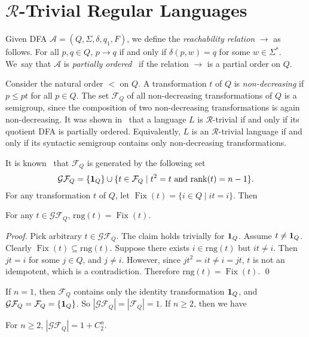 \documentclass{llncs}
\renewcommand{\le}{\leqslant}
\renewcommand{\ge}{\geqslant}
\newcommand{\Sig}{\Sigma}
\newcommand{\txt}[1]{\mbox{ #1 }}
\newcommand{\trng}{\mathrm{rng}}
\newcommand{\trank}{\mathrm{rank}}
\newcommand{\tid}{\mbox{{\bf 1}}}
\newcommand{\cA}{{\mathcal A}}
\newcommand{\cF}{{\mathcal F}}
\newcommand{\cG}{{\mathcal G}}
\newcommand{\gR}{{\mathcal R}}
\newcommand{\ra}{{\rightarrow}}
\DeclareMathOperator{\Fix}{Fix}
\begin{document}
\section{$\gR$-Trivial Regular Languages}\label{sec:Rtrivial} 

Given DFA $\cA = (Q, \Sig, \delta, q_1, F)$, we  define the \emph{reachability relation} $\ra$ as follows. For all $p, q \in Q$, $p \mathbin{\ra} q$ if and only if $\delta(p, w) = q$ for some $w \in \Sig^*$. We~say that $\cA$ is \emph{partially ordered}~\cite{BrFi80} if the relation $\ra$ is a partial order on $Q$. 

Consider the natural order $<$ on $Q$. A transformation $t$ of $Q$ is \emph{non-decreasing} if $p \le pt$ for all $p \in Q$. The set $\cF_Q$ of all non-decreasing transformations of $Q$ is a semigroup, since the composition of two non-decreasing transformations is again non-decreasing. It was shown in~\cite{BrFi80} that a language $L$ is $\gR$-trivial if and only if its quotient DFA is partially ordered. Equivalently, $L$ is an $\gR$-trivial language if and only if its syntactic semigroup contains only non-decreasing transformations. 


 It is known~\cite{GaMa09} that  $\cF_Q$ is generated by the following set 
$$\cG\cF_Q = \{\tid_Q\} \cup \{t \in \cF_Q \mid t^2 = t \txt{and} \trank(t) = n-1\}.$$
For any transformation $t$ of $Q$, let $\Fix(t) = \{i \in Q \mid it = i\}$. Then 


\begin{lemma}\label{lem:fixrank} 
For any $t \in \cG\cF_Q$, $\trng(t) = \Fix(t)$. 
\end{lemma}

\begin{proof} 
Pick arbitrary $t \in \cG\cF_Q$. The claim holds trivially for $\tid_Q$. Assume $t \neq \tid_Q$. Clearly $\Fix(t) \subseteq \trng(t)$. Suppose there exists $i \in \trng(t)$ but $it \neq i$. Then $jt = i$ for some $j \in Q$, and $j \neq i$. However, since $jt^2 = it \neq i = jt$, $t$ is not an idempotent, which is a contradiction. Therefore $\trng(t) = \Fix(t)$. \qed
\end{proof}

If $n = 1$, then $\cF_Q$ contains only the identity transformation $\tid_Q$, and $\cG\cF_Q = \cF_Q = \{\tid_Q\}$. So $|\cG\cF_Q| = |\cF_Q| = 1$. If $n \ge 2$, then we have

\begin{lemma}\label{lem:carGF}
For $n \ge 2$, $|\cG\cF_Q| = 1 + C^n_2$. 
\end{lemma}
\end{document}
